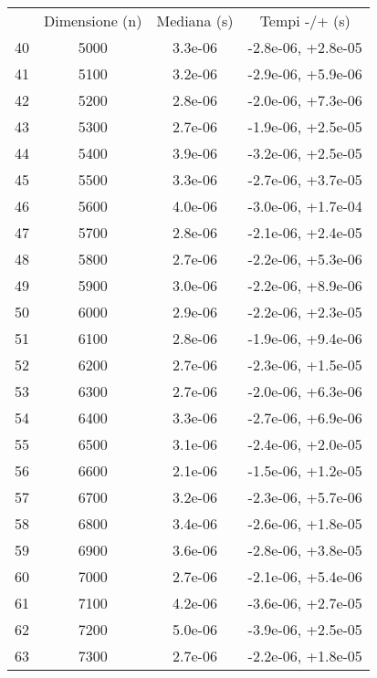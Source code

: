 \begin{table}
\centering
\begin{adjustbox}{width=1\textwidth/2}
\begin{tabular}{|c|c|c|c|}
\hline
 & Dimensione (n) & Mediana (s) & Tempi -/+ (s) \\
40 & 5000 & 3.3e-06 & -2.8e-06, +2.8e-05 \\
\cline{1-4}
41 & 5100 & 3.2e-06 & -2.9e-06, +5.9e-06 \\
\cline{1-4}
42 & 5200 & 2.8e-06 & -2.0e-06, +7.3e-06 \\
\cline{1-4}
43 & 5300 & 2.7e-06 & -1.9e-06, +2.5e-05 \\
\cline{1-4}
44 & 5400 & 3.9e-06 & -3.2e-06, +2.5e-05 \\
\cline{1-4}
45 & 5500 & 3.3e-06 & -2.7e-06, +3.7e-05 \\
\cline{1-4}
46 & 5600 & 4.0e-06 & -3.0e-06, +1.7e-04 \\
\cline{1-4}
47 & 5700 & 2.8e-06 & -2.1e-06, +2.4e-05 \\
\cline{1-4}
48 & 5800 & 2.7e-06 & -2.2e-06, +5.3e-06 \\
\cline{1-4}
49 & 5900 & 3.0e-06 & -2.2e-06, +8.9e-06 \\
\cline{1-4}
50 & 6000 & 2.9e-06 & -2.2e-06, +2.3e-05 \\
\cline{1-4}
51 & 6100 & 2.8e-06 & -1.9e-06, +9.4e-06 \\
\cline{1-4}
52 & 6200 & 2.7e-06 & -2.3e-06, +1.5e-05 \\
\cline{1-4}
53 & 6300 & 2.7e-06 & -2.0e-06, +6.3e-06 \\
\cline{1-4}
54 & 6400 & 3.3e-06 & -2.7e-06, +6.9e-06 \\
\cline{1-4}
55 & 6500 & 3.1e-06 & -2.4e-06, +2.0e-05 \\
\cline{1-4}
56 & 6600 & 2.1e-06 & -1.5e-06, +1.2e-05 \\
\cline{1-4}
57 & 6700 & 3.2e-06 & -2.3e-06, +5.7e-06 \\
\cline{1-4}
58 & 6800 & 3.4e-06 & -2.6e-06, +1.8e-05 \\
\cline{1-4}
59 & 6900 & 3.6e-06 & -2.8e-06, +3.8e-05 \\
\cline{1-4}
60 & 7000 & 2.7e-06 & -2.1e-06, +5.4e-06 \\
\cline{1-4}
61 & 7100 & 4.2e-06 & -3.6e-06, +2.7e-05 \\
\cline{1-4}
62 & 7200 & 5.0e-06 & -3.9e-06, +2.5e-05 \\
\cline{1-4}
63 & 7300 & 2.7e-06 & -2.2e-06, +1.8e-05 \\

\end{tabular}
\end{adjustbox}
\end{table}
